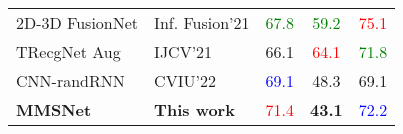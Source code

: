 \begin{table}[!h]
\begin{center}
\begin{adjustbox}{width=\columnwidth}
\begin{tabular}{ llccc }
				2D-3D FusionNet \citep{2021_IF_Montoro}  			& Inf. Fusion'21& \bftab\textcolor{green}{67.8} 				& \bftab\textcolor{green}{59.2}	        	& \bftab\textcolor{red}{75.1} 	\\
				TRecgNet Aug \citep{2021_IJCV_Du}  					& IJCV'21		& 66.1 				& \bftab\textcolor{red}{64.1}	        	& \bftab\textcolor{green}{71.8} 	\\
				CNN-randRNN \citep{2022_CVIU_Caglayan}         		& CVIU'22		& \bftab\textcolor{blue}{69.1} 				& 48.3 	        	& 69.1 	\\ \hline
				\textbf{MMSNet}  									& \textbf{This work}		& \bftab\textcolor{red}{71.4}		& \textbf{43.1}  	& \bftab\textcolor{blue}{72.2} \\ %
				\hline
			\end{tabular}
		\end{adjustbox}
		\label{table:nyuv2Results}
	\end{center}
\end{table}